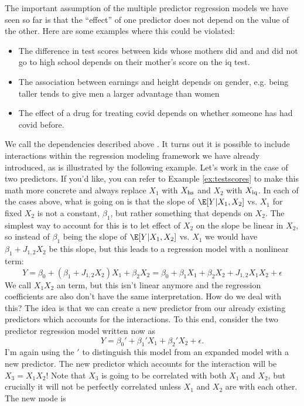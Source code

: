 The important assumption of the multiple predictor regression models we have seen so far is that the ``effect'' of one predictor does not depend on the value of the other. Here are some examples where this could be violated:
\begin{itemize}
\item The difference in test scores between kids whose mothers did and and did not go to high school depends on their mother's score on the iq test.
\item  The association between earnings and height depends on gender, e.g. being taller tends to give men a larger advantage than women
\item The effect of a drug for treating covid depends on whether someone has had covid before. 
\end{itemize}
We call the dependencies described above . 
It turns out it is possible to include interactions within the regression modeling framework we have already introduced, as is illustrated by the following example. 
 Let's work in the case of two predictors. If you'd like, you can refer to Example \ref{ex:testscores} to make this math more concrete and always replace $X_1$ with $X_{\rm hs}$ and $X_2$ with $X_{\rm iq}$.   In each of the cases above, what is going on is that the slope of $\E[Y|X_1,X_2]$ vs. $X_1$ for fixed $X_2$ is not a constant, $\beta_1$, but rather something that depends on $X_2$. The simplest way to account for this is to let effect of $X_2$ on the slope be linear in $X_2$, so instead of $\beta_1$ being the slope of $\E[Y|X_1,X_2]$ vs. $X_1$ we would have $\beta_1 +J_{1,2}X_2$ be this slope, but this leads to a regression model with a nonlinear term: 
\begin{equation*}
Y = \beta_0 +(\beta_1 + J_{1,2}X_2) X_1  + \beta_2 X_2 = \beta_0 + \beta_1 X_1 + \beta_2 X_2 + J_{1,2}X_1 X_2 + \epsilon 
\end{equation*}
We call $X_1X_2$ an  term, but this isn't linear anymore and the regression coefficients are also don't have the same interpretation. How do we deal with this? 
 The idea is that we can create a new predictor from our already existing predictors which accounts for the interactions. To this end, consider the two predictor regression model written now as 
\begin{equation*}
Y = \beta_0' + \beta_1' X_1 + \beta_2' X_2 + \epsilon.
\end{equation*} 
I'm again using the $'$ to distinguish this model from an expanded model with a new predictor. The new predictor which accounts for the interaction will be $X_3 = X_1X_2$! Note that $X_3$ is going to be correlated with both $X_1$ and $X_2$, but crucially it will not be perfectly correlated unless $X_1$ and $X_2$ are with each other. The new mode is 
